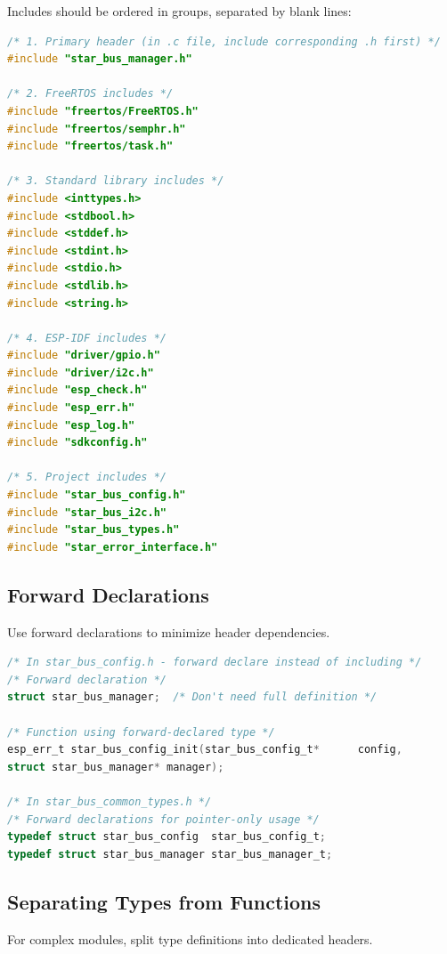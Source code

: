 Includes should be ordered in groups, separated by blank lines:

\begin{lstlisting}[language=C]
/* 1. Primary header (in .c file, include corresponding .h first) */
#include "star_bus_manager.h"

/* 2. FreeRTOS includes */
#include "freertos/FreeRTOS.h"
#include "freertos/semphr.h"
#include "freertos/task.h"

/* 3. Standard library includes */
#include <inttypes.h>
#include <stdbool.h>
#include <stddef.h>
#include <stdint.h>
#include <stdio.h>
#include <stdlib.h>
#include <string.h>

/* 4. ESP-IDF includes */
#include "driver/gpio.h"
#include "driver/i2c.h"
#include "esp_check.h"
#include "esp_err.h"
#include "esp_log.h"
#include "sdkconfig.h"

/* 5. Project includes */
#include "star_bus_config.h"
#include "star_bus_i2c.h"
#include "star_bus_types.h"
#include "star_error_interface.h"
\end{lstlisting}

\subsection{Forward Declarations}

Use forward declarations to minimize header dependencies.

\begin{lstlisting}[language=C]
/* In star_bus_config.h - forward declare instead of including */
/* Forward declaration */
struct star_bus_manager;  /* Don't need full definition */

/* Function using forward-declared type */
esp_err_t star_bus_config_init(star_bus_config_t*      config,
struct star_bus_manager* manager);

/* In star_bus_common_types.h */
/* Forward declarations for pointer-only usage */
typedef struct star_bus_config  star_bus_config_t;
typedef struct star_bus_manager star_bus_manager_t;
\end{lstlisting}

\subsection{Separating Types from Functions}

For complex modules, split type definitions into dedicated headers.


